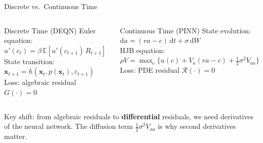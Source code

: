 \documentclass[aspectratio=169,11pt]{beamer}
\newcommand{\emphc}[1]{\textcolor{harvardcrimson}{#1}}
\newcommand{\x}{\bm{x}}
\newcommand{\E}[1]{\mathbb{E}\!\left[#1\right]}
\begin{document}
\begin{frame}{Discrete vs.\ Continuous Time}
\begin{columns}[T]
\begin{block}{Discrete Time (DEQN)}
\centering\small
\vspace{0.2em}
Euler equation:\\[4pt]
$u'(c_t) = \beta\,\E{u'(c_{t+1})\,R_{t+1}}$\\[8pt]
State transition:\\[4pt]
$\x_{t+1} = h(\x_t, p(\x_t), \varepsilon_{t+1})$\\[8pt]
Loss: algebraic residual $G(\cdot) = 0$
\vspace{0.2em}
\end{block}

\begin{exampleblock}{Continuous Time (PINN)}
\centering\small
\vspace{0.2em}
State evolution:\\[4pt]
$\mathrm{d}a = (ra - c)\,\mathrm{d}t + \sigma\,\mathrm{d}W$\\[8pt]
HJB equation:\\[4pt]
$\rho V = \max_c \bigl\{u(c) + V_a(ra-c) + \tfrac{1}{2}\sigma^2 V_{aa}\bigr\}$\\[8pt]
Loss: PDE residual $\mathcal{R}(\cdot) = 0$
\vspace{0.2em}
\end{exampleblock}
\end{columns}

\vspace{0.6em}
\begin{center}
{\small \emphc{Key shift:} from algebraic residuals to \textbf{differential} residuals, we need \emphc{derivatives} of the neural network. The diffusion term $\tfrac{1}{2}\sigma^2 V_{aa}$ is why \emphc{second} derivatives matter.}
\end{center}
\end{frame}
\end{document}

